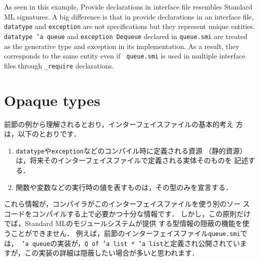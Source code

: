\documentclass{jbook}
\newif\ifjp
\newcommand{\txt}[2]{#2}
\begin{document}
	As seen in this example, Provide declarations in interface file
resembles Standard ML signatures.
	A big difference is that in provide declarations in an interface
file, {\tt datatype} and {\tt exception} are not specifications but they
represent unique entities.
	{\tt datatype 'a queue} and {\tt exception Dequeue} declared in
{\tt queue.smi} are treated as the generative type and exception in its
implementation.
	As a result, they corresponds to the same entity even if {\tt
queue.smi} is used in multiple interface files through  {\tt \_require}
declarations.

\fi%

\section{\txt{型の隠蔽}{Opaque types}}
\label{sec:tutorialOpaqueTypeInterface}

\ifjp%
	前節の例から理解されるとおり，インターフェイスファイルの基本的考え
方は，以下のとおりです．
\begin{enumerate}
\item {\tt datatype}や{\tt exception}などのコンパイル時に定義される資源
（静的資源）は，将来そのインターフェイスファイルで定義される実体そのものを
記述する．
\item 関数や変数などの実行時の値を表すものは，その型のみを宣言する．
\end{enumerate}
	これら情報が，コンパイラがこのインターフェイスファイルを使う別のソー
スコードをコンパイルする上で必要かつ十分な情報です．
	しかし，この原則だけでば，Standard MLのモジュールシステムが提供
する型情報の隠蔽の機能を使うことができません．
	例えば，前節のインターフェイスファイル{\tt queue.smi}では，{\tt
'a queue}の実装が，{\tt Q of 'a list * 'a list}と定義され公開されていま
すが，この実装の詳細は隠蔽したい場合が多いと思われます．
\end{document}
